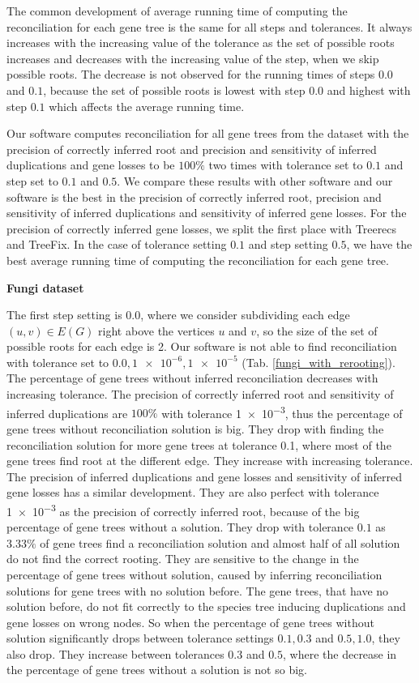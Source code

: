 The common development of average running time of computing the reconciliation for each gene tree is the same for all steps and tolerances. It always increases with the increasing value of the tolerance as the set of possible roots increases and decreases with the increasing value of the step, when we skip possible roots. The decrease is not observed for the running times of steps $0.0$ and $0.1$, because the set of possible roots is lowest with step $0.0$ and highest with step $0.1$ which affects the average running time.

Our software computes reconciliation for all gene trees from the dataset with the precision of correctly inferred root and precision and sensitivity of inferred duplications and gene losses to be $100\%$ two times with tolerance set to $0.1$ and step set to $0.1$ and $0.5$. We compare these results with other software and our software is the best in the precision of correctly inferred root, precision and sensitivity of inferred duplications and sensitivity of inferred gene losses. For the precision of correctly inferred gene losses, we split the first place with Treerecs and TreeFix. In the case of tolerance setting $0.1$ and step setting $0.5$, we have the best average running time of computing the reconciliation for each gene tree.

\noindent \textbf{Fungi dataset}

The first step setting is $0.0$, where we consider subdividing each edge $(u,v) \in E(G)$ right above the vertices $u$ and $v$, so the size of the set of possible roots for each edge is 2. Our software is not able to find reconciliation with tolerance set to $0.0, \num{1e-6}, \num{1e-5}$ (Tab. \ref{fungi_with_rerooting}). The percentage of gene trees without inferred reconciliation decreases with increasing tolerance. The precision of correctly inferred root and sensitivity of inferred duplications are $100\%$ with tolerance \num{1e-3}, thus the percentage of gene trees without reconciliation solution is big. They drop with finding the reconciliation solution for more gene trees at tolerance \num{0.1}, where most of the gene trees find root at the different edge. They increase with increasing tolerance. The precision of inferred duplications and gene losses and sensitivity of inferred gene losses has a similar development. They are also perfect with tolerance \num{1e-3} as the precision of correctly inferred root, because of the big percentage of gene trees without a solution. They drop with tolerance $0.1$ as $3.33\%$ of gene trees find a reconciliation solution and almost half of all solution do not find the correct rooting. They are sensitive to the change in the percentage of gene trees without solution, caused by inferring reconciliation solutions for gene trees with no solution before. The gene trees, that have no solution before, do not fit correctly to the species tree inducing duplications and gene losses on wrong nodes. So when the percentage of gene trees without solution significantly drops between tolerance settings $0.1, 0.3$ and $0.5, 1.0$, they also drop. They increase between tolerances $0.3$ and $0.5$, where the decrease in the percentage of gene trees without a solution is not so big.

